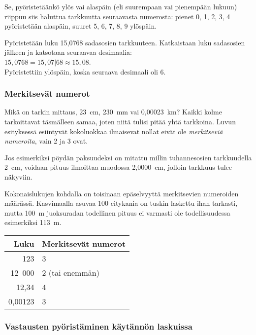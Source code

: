 Se, pyöristetäänkö ylös vai alaspäin (eli suurempaan vai
pienempään lukuun) riippuu siis haluttua tarkkuutta
seuraavasta numerosta: pienet
0, 1, 2, 3, 4 pyöristetään alaspäin, suuret 5, 6, 7, 8, 9 ylöspäin.

\begin{esimerkki}
Pyöristetään luku 15,0768 sadasosien tarkkuuteen. Katkaistaan
luku sadasosien jälkeen ja katsotaan seuraavaa desimaalia:\\
$15,0768 = 15,07|68 \approx 15,08$.\\
Pyöristettiin ylöspäin, koska seuraava desimaali oli 6.
\end{esimerkki}

\subsubsection*{Merkitsevät numerot}

Mikä on tarkin mittaus, 23~cm, 230~mm vai 0,00023~km? Kaikki kolme tarkoittavat täsmälleen samaa, joten niitä tulisi pitää
yhtä tarkkoina. Luvun esityksessä esiintyvät kokoluokkaa ilmaisevat nollat eivät ole \emph{merkitseviä numeroita}, vain
2 ja 3 ovat.


Jos esimerkiksi pöydän paksuudeksi on mitattu millin tuhannesosien
tarkkuudella 2~cm, voidaan pituus ilmoittaa muodossa 2,0000~cm, jolloin tarkkuus tulee näkyviin. 

Kokonaislukujen kohdalla on toisinaan epäselvyyttä merkitsevien numeroiden määrässä. Kasvimaalla asuvaa 100 citykania on tuskin laskettu ihan tarkasti,
mutta 100~m juoksuradan todellinen pituus ei varmasti ole todellisuudessa
esimerkiksi 113~m.

\begin{center}
\begin{tabular}{r|l}
Luku & Merkitsevät numerot \\
\hline
123 & 3 \\
12~000 & 2 (tai enemmän)\\
12,34 & 4 \\
0,00123 & 3
\end{tabular}
\end{center}

\subsubsection*{Vastausten pyöristäminen käytännön laskuissa}

